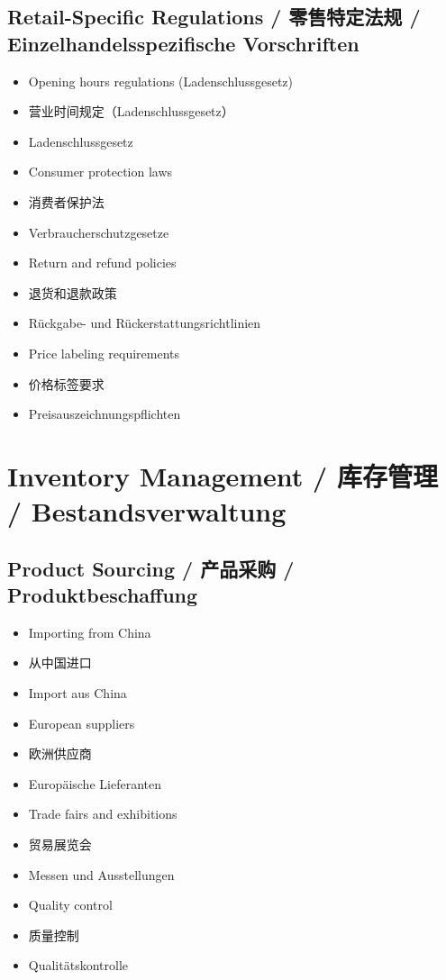 \subsection{Retail-Specific Regulations / 零售特定法规 / Einzelhandelsspezifische Vorschriften}
\begin{itemize}
    \item Opening hours regulations (Ladenschlussgesetz)
    \item 营业时间规定（Ladenschlussgesetz）
    \item Ladenschlussgesetz
    \item Consumer protection laws
    \item 消费者保护法
    \item Verbraucherschutzgesetze
    \item Return and refund policies
    \item 退货和退款政策
    \item Rückgabe- und Rückerstattungsrichtlinien
    \item Price labeling requirements
    \item 价格标签要求
    \item Preisauszeichnungspflichten
\end{itemize}

\section{Inventory Management / 库存管理 / Bestandsverwaltung}

\subsection{Product Sourcing / 产品采购 / Produktbeschaffung}
\begin{itemize}
    \item Importing from China
    \item 从中国进口
    \item Import aus China
    \item European suppliers
    \item 欧洲供应商
    \item Europäische Lieferanten
    \item Trade fairs and exhibitions
    \item 贸易展览会
    \item Messen und Ausstellungen
    \item Quality control
    \item 质量控制
    \item Qualitätskontrolle
\end{itemize}

